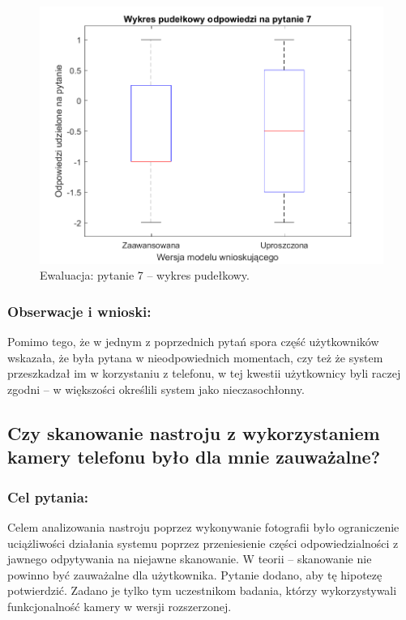 	\begin{figure}[H]
		\centering
		\includegraphics[scale=0.8]{rozdzial5/Ewaluacja7.png}
		\caption{Ewaluacja: pytanie 7 -- wykres pudełkowy.}
	\end{figure}
	
	\subsubsection{Obserwacje i wnioski:}
	
	Pomimo tego, że w jednym z poprzednich pytań spora część użytkowników wskazała, że była pytana w nieodpowiednich momentach, czy też że system przeszkadzał im w korzystaniu z telefonu, w tej kwestii użytkownicy byli raczej zgodni -- w większości określili system jako nieczasochłonny.
	
	
	
\subsection{Czy skanowanie nastroju z wykorzystaniem kamery telefonu było dla mnie zauważalne?}
	
	\subsubsection{Cel pytania:}
	
	Celem analizowania nastroju poprzez wykonywanie fotografii było ograniczenie uciążliwości działania systemu poprzez przeniesienie części odpowiedzialności z jawnego odpytywania na niejawne skanowanie. W teorii -- skanowanie nie powinno być zauważalne dla użytkownika. Pytanie dodano, aby tę hipotezę potwierdzić. Zadano je tylko tym uczestnikom badania, którzy wykorzystywali funkcjonalność kamery w wersji rozszerzonej.
	
